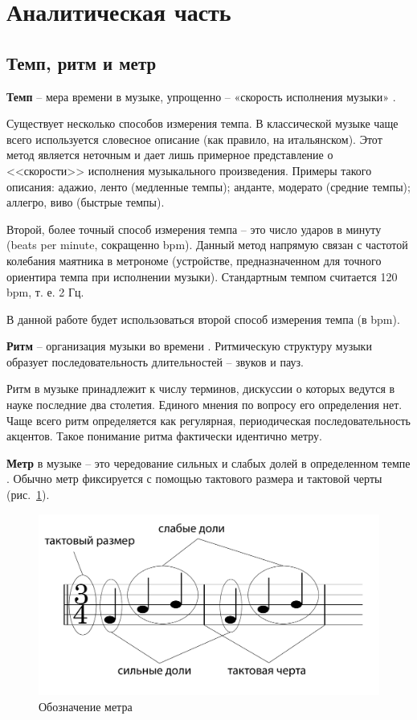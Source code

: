 \section{Аналитическая часть}

\subsection{Темп, ритм и метр}

\textbf{Темп} -- мера времени в музыке, упрощенно -- «скорость исполнения музыки» \cite{grouv}.

Существует несколько способов измерения темпа. В классической музыке чаще всего используется словесное описание (как правило, на итальянском). Этот метод является неточным и дает лишь примерное представление о <<скорости>> исполнения музыкального произведения. Примеры такого описания: адажио, ленто (медленные темпы); анданте, модерато (средние темпы); аллегро, виво (быстрые темпы).

Второй, более точный способ измерения темпа -- это число ударов в минуту (beats per minute, сокращенно bpm). Данный метод напрямую связан с частотой колебания маятника в метрономе (устройстве, предназначенном для точного ориентира темпа при исполнении музыки). Стандартным темпом считается 120 bpm, т. е. 2 Гц.

В данной работе будет использоваться второй способ измерения темпа (в bpm).

\textbf{Ритм} -- организация музыки во времени \cite{chehovich}. Ритмическую структуру музыки образует последовательность длительностей -- звуков и пауз.

Ритм в музыке принадлежит к числу терминов, дискуссии о которых ведутся в науке последние два столетия. Единого мнения по вопросу его определения нет. Чаще всего ритм определяется как регулярная, периодическая последовательность акцентов. Такое понимание ритма фактически идентично метру.

\textbf{Метр} в музыке -- это чередование сильных и слабых долей в определенном темпе \cite{grouv}. Обычно метр фиксируется с помощью тактового размера и тактовой черты (рис.~\ref{img:meter}).

\begin{figure}[h]
	\centering
	\includegraphics[scale=0.4]{svg/barlines.pdf}
	\caption{Обозначение метра}
	\label{img:meter}
\end{figure}

